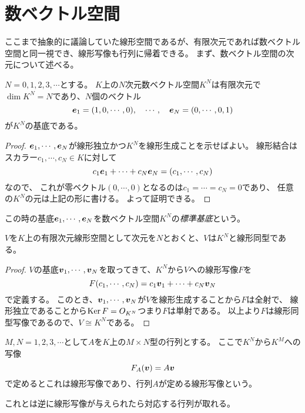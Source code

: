 \section{数ベクトル空間}

ここまで抽象的に議論していた線形空間であるが、有限次元であれば数ベクトル空間と同一視でき、線形写像も行列に帰着できる。
まず、数ベクトル空間の次元について述べる。

\begin{proposition}
$N = 0, 1, 2, 3, \cdots$とする。
$K$上の$N$次元数ベクトル空間$K^N$は有限次元で$\dim K^N = N$であり、$N$個のベクトル
$$
\vb*{e}_1 = (1, 0, \cdots, 0),
\quad \cdots,
\quad \vb*{e}_N = (0, \cdots, 0, 1)
$$
が$K^N$の基底である。
\end{proposition}

\begin{proof}
$\vb*{e}_1, \cdots, \vb*{e}_N$が線形独立かつ$K^N$を線形生成ことを示せばよい。
線形結合はスカラー$c_1, \cdots, c_N \in K$に対して
$$
c_1\vb*{e}_1+\cdots+c_N\vb*{e}_N = (c_1, \cdots, c_N)
$$
なので、
これが零ベクトル$(0, \cdots, 0)$となるのは$c_1 = \cdots = c_N = 0$であり、
任意の$K^N$の元は上記の形に書ける。
よって証明できる。
\end{proof}

この時の基底$\vb*{e}_1, \cdots, \vb*{e}_N$を数ベクトル空間$K^N$の\emph{標準基底}という。

\begin{proposition}
$V$を$K$上の有限次元線形空間として次元を$N$とおくと、$V$は$K^N$と線形同型である。
\end{proposition}

\begin{proof}
$V$の基底$\vb*{v}_1, \cdots, \vb*{v}_N$を取ってきて、$K^N$から$V$への線形写像$F$を
$$
F(c_1, \cdots, c_N) = c_1\vb*{v}_1+\cdots+c_N\vb*{v}_N
$$
で定義する。
このとき、$\vb*{v}_1, \cdots, \vb*{v}_N$が$V$を線形生成することから$F$は全射で、
線形独立であることから$\operatorname{Ker} F = O_{K^N}$つまり$F$は単射である。
以上より$F$は線形同型写像であるので、$V \cong K^N$である。
\end{proof}

$M, N = 1, 2, 3, \cdots$として$A$を$K$上の$M\times N$型の行列とする。
ここで$K^N$から$K^M$への写像
$$
F_A(\vb*{v}) = A\vb*{v}
$$
で定めるとこれは線形写像であり、行列$A$が定める線形写像という。

これとは逆に線形写像が与えられたら対応する行列が取れる。

